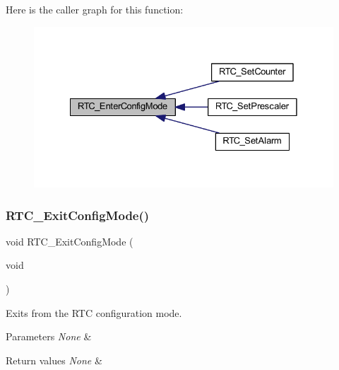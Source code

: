 Here is the caller graph for this function\+:
\nopagebreak
\begin{figure}[H]
\begin{center}
\leavevmode
\includegraphics[width=328pt]{group___r_t_c___exported___functions_ga23612d9da2fe057a0cd72c684e5b438a_icgraph}
\end{center}
\end{figure}
\mbox{\label{group___r_t_c___exported___functions_ga7585aa6e2dbb497173b2fd03bac0d304}} 
\subsubsection{\texorpdfstring{R\+T\+C\+\_\+\+Exit\+Config\+Mode()}{RTC\_ExitConfigMode()}}
{\footnotesize\ttfamily void R\+T\+C\+\_\+\+Exit\+Config\+Mode (\begin{DoxyParamCaption}\item[{void}]{ }\end{DoxyParamCaption})}



Exits from the R\+TC configuration mode. 


\begin{DoxyParams}{Parameters}
{\em None} & \\
\hline
\end{DoxyParams}

\begin{DoxyRetVals}{Return values}
{\em None} & \\
\hline
\end{DoxyRetVals}


